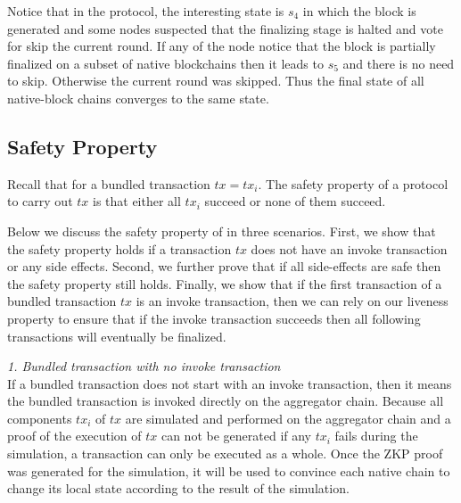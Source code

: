 
Notice that in the protocol, the interesting state is $s_4$ in which the block is generated and some nodes suspected that the finalizing stage is halted and vote for skip the current round. If any of the node notice that the block is partially finalized on a subset of native blockchains then it leads to $s_5$ and there is no need to skip. Otherwise the current round was skipped. Thus the final state of all native-block chains converges to the same state.

\subsection{Safety Property}
Recall that for a bundled transaction $tx = {tx_i}$. The safety property of a protocol to carry out $tx$ is that either all $tx_i$ succeed or none of them succeed.

Below we discuss the safety property of \dprotocol in three scenarios. First, we show that the safety property holds if a transaction $tx$ does not have an invoke transaction or any side effects. Second, we further prove that if all side-effects are safe then the safety property still holds. Finally, we show that if the first transaction of a bundled transaction $tx$ is an invoke transaction, then we can rely on our liveness property to ensure that if the invoke transaction succeeds then all following transactions will eventually be finalized.


\smallskip\noindent\emph{1. Bundled transaction with no invoke transaction}\\
If a bundled transaction does not start with an invoke transaction, then it means the bundled transaction is invoked directly on the aggregator chain. Because all components $tx_i$ of $tx$ are simulated and performed on the aggregator chain and a proof of the execution of $tx$ can not be generated if any $tx_i$ fails during the simulation, a transaction can only be executed as a whole. Once the ZKP proof was generated for the simulation, it will be used to convince each native chain to change its local state according to the result of the simulation.


